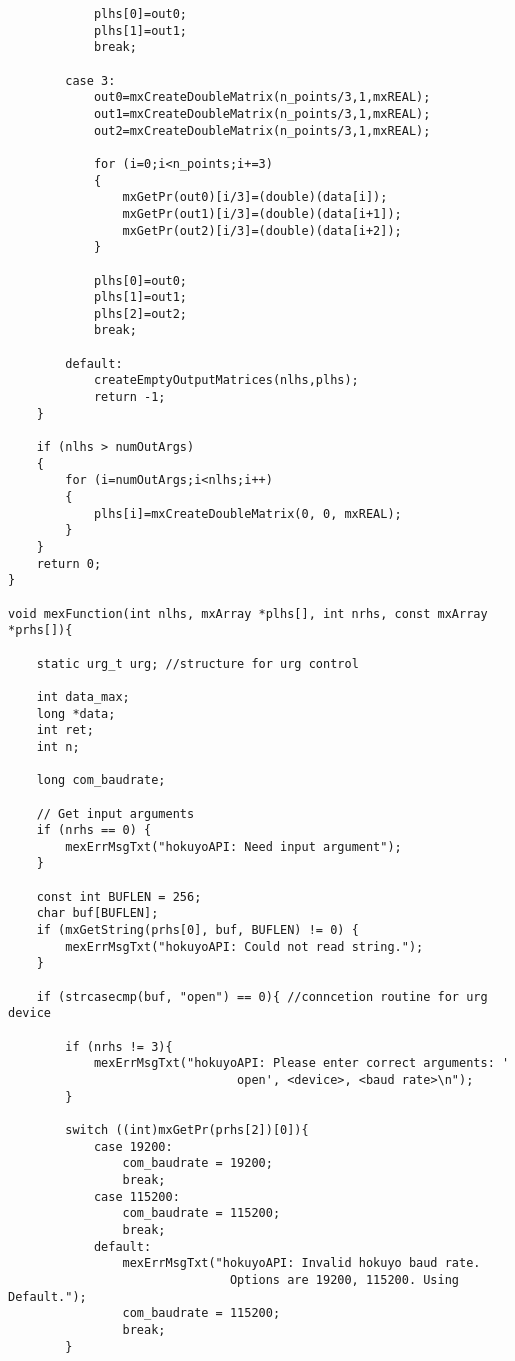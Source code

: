 \begin{lstlisting}
            plhs[0]=out0;
            plhs[1]=out1;
            break;

        case 3:
            out0=mxCreateDoubleMatrix(n_points/3,1,mxREAL);
            out1=mxCreateDoubleMatrix(n_points/3,1,mxREAL);
            out2=mxCreateDoubleMatrix(n_points/3,1,mxREAL);

            for (i=0;i<n_points;i+=3)
            {
                mxGetPr(out0)[i/3]=(double)(data[i]);
                mxGetPr(out1)[i/3]=(double)(data[i+1]);
                mxGetPr(out2)[i/3]=(double)(data[i+2]);
            }

            plhs[0]=out0;
            plhs[1]=out1;
            plhs[2]=out2;
            break;

        default:
            createEmptyOutputMatrices(nlhs,plhs);
            return -1;
    }

    if (nlhs > numOutArgs)
    {
        for (i=numOutArgs;i<nlhs;i++)
        {
            plhs[i]=mxCreateDoubleMatrix(0, 0, mxREAL);
        }
    }
    return 0;
}

void mexFunction(int nlhs, mxArray *plhs[], int nrhs, const mxArray *prhs[]){

	static urg_t urg; //structure for urg control

	int data_max;
	long *data;
	int ret;
	int n;

	long com_baudrate;

    // Get input arguments
    if (nrhs == 0) {
        mexErrMsgTxt("hokuyoAPI: Need input argument");
    }

    const int BUFLEN = 256;
    char buf[BUFLEN];
    if (mxGetString(prhs[0], buf, BUFLEN) != 0) {
        mexErrMsgTxt("hokuyoAPI: Could not read string.");
    }

    if (strcasecmp(buf, "open") == 0){ //conncetion routine for urg device

        if (nrhs != 3){ 
            mexErrMsgTxt("hokuyoAPI: Please enter correct arguments: '
                                open', <device>, <baud rate>\n");
        }

        switch ((int)mxGetPr(prhs[2])[0]){
            case 19200:
                com_baudrate = 19200;
                break;
            case 115200:
                com_baudrate = 115200;
                break;
            default:
                mexErrMsgTxt("hokuyoAPI: Invalid hokuyo baud rate. 
                               Options are 19200, 115200. Using Default.");
                com_baudrate = 115200;
                break;
        }


\end{lstlisting}
